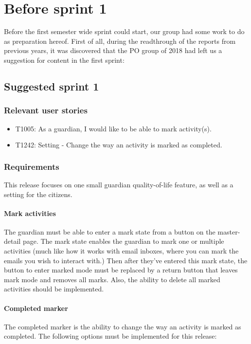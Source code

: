 \section{Before sprint 1}
Before the first semester wide sprint could start, our group had some work to do as preparation hereof.
First of all, during the readthrough of the reports from previous years, it was discovered that the PO group of 2018 had left us a suggestion for content in the first sprint:

\subsection*{Suggested sprint 1}
\subsubsection*{Relevant user stories}
\begin{itemize}
    \item T1005: As a guardian, I would like to be able to mark activity(s). 
    \item T1242: Setting - Change the way an activity is marked as completed. 
\end{itemize}

\subsubsection{Requirements}
This release focuses on one small guardian quality-of-life feature, as well as a setting for the citizens.

\paragraph{Mark activities}
The guardian must be able to enter a mark state from a button on the master-detail page. The mark state enables the guardian to mark one or multiple activities (much like how it works with email inboxes, where you can mark the emails you wish to interact with.) Then after they've entered this mark state, the button to enter marked mode must be replaced by a return button that leaves mark mode and removes all marks. Also, the ability to delete all marked activities should be implemented.

\paragraph{Completed marker}
The completed marker is the ability to change the way an activity is marked as completed. The following options must be implemented for this release:

